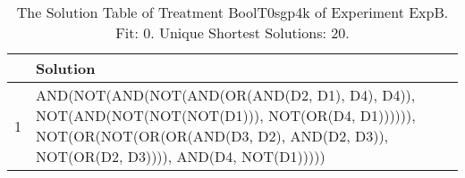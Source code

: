 \begin{table}[ht]
\centering
\begin{tabular}{rp{9cm}}
  \hline
 & Solution \\ 
  \hline
1 & AND(NOT(AND(NOT(AND(OR(AND(D2, D1), D4), D4)), NOT(AND(NOT(NOT(NOT(D1))), NOT(OR(D4, D1)))))), NOT(OR(NOT(OR(OR(AND(D3, D2), AND(D2, D3)), NOT(OR(D2, D3)))), AND(D4, NOT(D1))))) \\ 
   \hline
\end{tabular}
\caption{The Solution Table of Treatment BoolT0sgp4k of Experiment ExpB. Fit: 0. Unique Shortest Solutions: 20.} 
\end{table}
